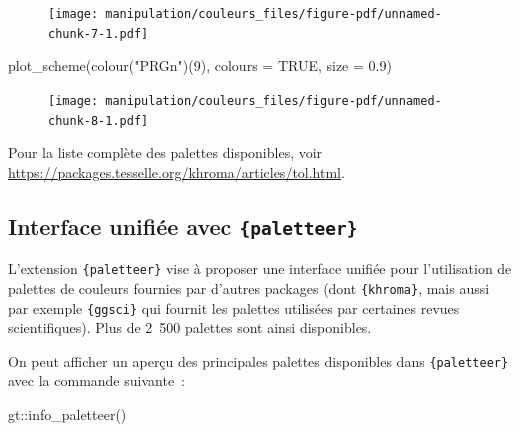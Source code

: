\documentclass[
  letterpaper,
  DIV=11,
  numbers=noendperiod,
  oneside]{scrreprt}
\newenvironment{Shaded}{\begin{snugshade}}{\end{snugshade}}
\newcommand{\AttributeTok}[1]{\textcolor[rgb]{0.40,0.45,0.13}{#1}}
\newcommand{\ConstantTok}[1]{\textcolor[rgb]{0.56,0.35,0.01}{#1}}
\newcommand{\DecValTok}[1]{\textcolor[rgb]{0.68,0.00,0.00}{#1}}
\newcommand{\FloatTok}[1]{\textcolor[rgb]{0.68,0.00,0.00}{#1}}
\newcommand{\FunctionTok}[1]{\textcolor[rgb]{0.28,0.35,0.67}{#1}}
\newcommand{\NormalTok}[1]{\textcolor[rgb]{0.00,0.23,0.31}{#1}}
\newcommand{\SpecialCharTok}[1]{\textcolor[rgb]{0.37,0.37,0.37}{#1}}
\newcommand{\StringTok}[1]{\textcolor[rgb]{0.13,0.47,0.30}{#1}}
\begin{document}
\begin{figure}[H]

{\centering \texttt{[image: manipulation/couleurs\_files/figure-pdf/unnamed-chunk-7-1.pdf]}

}

\end{figure}

\begin{Shaded}
\begin{Highlighting}[]
\FunctionTok{plot\_scheme}\NormalTok{(}\FunctionTok{colour}\NormalTok{(}\StringTok{"PRGn"}\NormalTok{)(}\DecValTok{9}\NormalTok{), }\AttributeTok{colours =} \ConstantTok{TRUE}\NormalTok{, }\AttributeTok{size =} \FloatTok{0.9}\NormalTok{)}
\end{Highlighting}
\end{Shaded}

\begin{figure}[H]

{\centering \texttt{[image: manipulation/couleurs\_files/figure-pdf/unnamed-chunk-8-1.pdf]}

}

\end{figure}

Pour la liste complète des palettes disponibles, voir
\url{https://packages.tesselle.org/khroma/articles/tol.html}.

\hypertarget{interface-unifiuxe9e-avec-paletteer}{%
\subsection{\texorpdfstring{Interface unifiée avec
\texttt{\{paletteer\}}}{Interface unifiée avec \{paletteer\}}}\label{interface-unifiuxe9e-avec-paletteer}}

L'extension \texttt{\{paletteer\}} vise à proposer une interface unifiée
pour l'utilisation de palettes de couleurs fournies par d'autres
packages (dont \texttt{\{khroma\}}, mais aussi par exemple
\texttt{\{ggsci\}} qui fournit les palettes utilisées par certaines
revues scientifiques). Plus de 2~500 palettes sont ainsi disponibles.

On peut afficher un aperçu des principales palettes disponibles dans
\texttt{\{paletteer\}} avec la commande suivante~:

\begin{Shaded}
\begin{Highlighting}[]
\NormalTok{gt}\SpecialCharTok{::}\FunctionTok{info\_paletteer}\NormalTok{()}
\end{Highlighting}
\end{Shaded}
\end{document}

